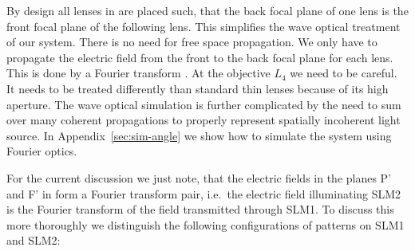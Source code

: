 By design all lenses in  are placed such, that
the back focal plane of one lens is the front focal plane of the
following lens. This simplifies the wave optical treatment of our
system. There is no need for free space propagation. We only have to
propagate the electric field from the front to the back focal plane
for each lens. This is done by a Fourier transform
\citep{Goodman1996}. At the objective $L_4$ we need to be careful. It
needs to be treated differently than standard thin lenses because of
its high aperture. The wave optical simulation is further complicated
by the need to sum over many coherent propagations to properly
represent spatially incoherent light source.  In
Appendix~\ref{sec:sim-angle} we show how to simulate the system using
Fourier optics.

For the current discussion we just note, that the electric fields in
the planes P' and F' in  form a Fourier
transform pair, i.e.\ the electric field illuminating SLM2 is the
Fourier transform of the field transmitted through SLM1. To discuss
this more thoroughly we distinguish the following configurations of
patterns on SLM1 and SLM2:
\newcommand{\sm}[1]{\raisebox{-2.5mm}{\texttt{[image: slm-\#1]}}}
